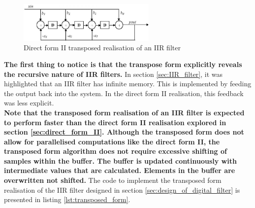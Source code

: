 \documentclass{article}
\begin{document}
\begin{figure}[H]
    \centering
    \includegraphics[width = 0.6\textwidth]{Direct_Form_2_transposed}
    \caption{Direct form II transposed realisation of an IIR filter}
    \label{fig:iir_transposed_form_II}
\end{figure}

\textbf{The first thing to notice is that the transpose form explicitly reveals the recursive nature of IIR filters.} In section \ref{sec:IIR_filter}, it was highlighted that an IIR filter has infinite memory. This is implemented by feeding the output back into the system. In the direct form II realisation, this feedback was less explicit.\\

\textbf{Note that the transposed form realisation of an IIR filter is expected to perform faster than the direct form II realisation explored in section \ref{sec:direct_form_II}. Although the transposed form does not allow for parallelised computations like the direct form II, the transposed form algorithm does not require excessive shifting of samples within the buffer. The buffer is updated continuously with intermediate values that are calculated. Elements in the buffer are overwritten not shifted.} The code to implement the transposed form realisation of the IIR filter designed in section \ref{sec:design_of_digital_filter} is presented in listing \ref{lst:transposed_form}.
\end{document}
